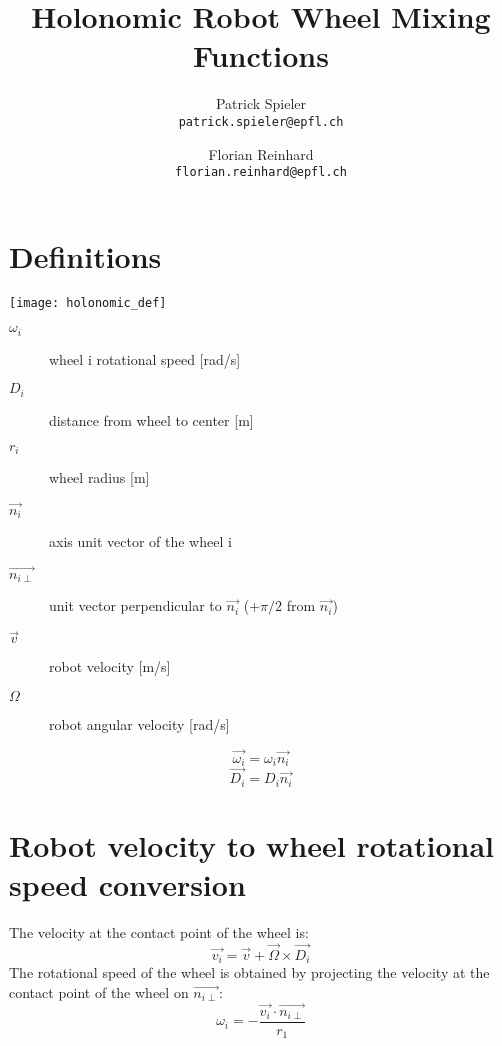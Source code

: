 \documentclass[a4paper]{paper}
\author{
Patrick Spieler \\
\texttt{patrick.spieler@epfl.ch}
\and
Florian Reinhard \\
\texttt{florian.reinhard@epfl.ch}
}
\title{Holonomic Robot Wheel Mixing Functions}
\begin{document}
\maketitle

\section{Definitions}

\texttt{[image: holonomic\_def]}

\begin{description}
    \item[$\omega_i$] wheel i rotational speed [rad/s]
    \item[$D_i$] distance from wheel to center [m]
    \item[$r_i$] wheel radius [m]
    \item[$\overrightarrow{n_i}$] axis unit vector of the wheel i
    \item[$\overrightarrow{n_{i\perp}}$] unit vector perpendicular to $\overrightarrow{n_i}$ ($+\pi/2$ from $\overrightarrow{n_i}$)
    \item[$\overrightarrow{v}$] robot velocity [m/s]
    \item[$\Omega$] robot angular velocity [rad/s]
\end{description}

\begin{equation}
    \overrightarrow{\omega_i} = \omega_i \overrightarrow{n_i}
\end{equation}
\begin{equation}
    \overrightarrow{D_i} = D_i \overrightarrow{n_i}
\end{equation}



\section{Robot velocity to wheel rotational speed conversion}

The velocity at the contact point of the wheel is:
\begin{equation}
    \overrightarrow{v_i} = \overrightarrow{v} + \overrightarrow{\Omega}\times\overrightarrow{D_i}
\end{equation}
The rotational speed of the wheel is obtained by projecting the velocity at
the contact point of the wheel on $\overrightarrow{n_{i\perp}}$:
\begin{equation}
    \omega_i = - \frac{\overrightarrow{v_i} \cdot \overrightarrow{n_{i\perp}}}{r_1}
\end{equation}
\end{document}
